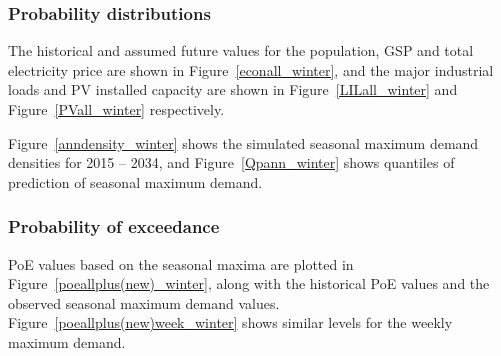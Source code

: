 \documentclass[11pt]{article}
\begin{document}
\subsubsection{Probability distributions}

The historical and assumed future values for the population, GSP and total electricity price are shown in Figure~\ref{econall_winter}, and the major industrial loads and PV installed capacity are shown in Figure~\ref{LILall_winter} and Figure~\ref{PVall_winter} respectively.





Figure~\ref{anndensity_winter} shows the simulated seasonal maximum demand densities for 2015 -- 2034, and Figure~\ref{Qpann_winter} shows quantiles of prediction of seasonal maximum demand.





\subsubsection{Probability of exceedance}\enlargethispage*{0.5cm}

PoE values based on the seasonal maxima are plotted in Figure~\ref{poeallplus(new)_winter}, along with the historical PoE values and the observed seasonal maximum demand values. Figure~\ref{poeallplus(new)week_winter} shows similar levels for the weekly maximum demand.

\end{document}
